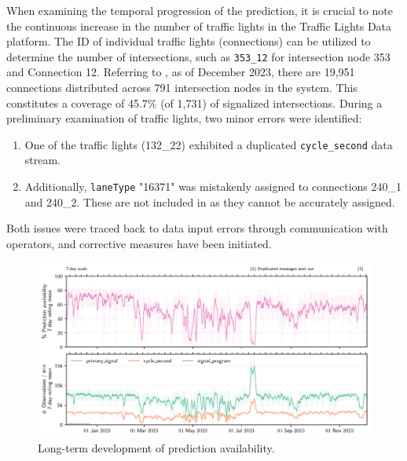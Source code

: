 When examining the temporal progression of the prediction, it is crucial to note the continuous increase in the number of traffic lights in the Traffic Lights Data platform. The ID of individual traffic lights (connections) can be utilized to determine the number of intersections, such as \texttt{353\_12} for intersection node 353 and Connection 12. Referring to , as of December 2023, there are 19,951 connections distributed across 791 intersection nodes in the system. This constitutes a coverage of 45.7\% (of 1,731) of signalized intersections. During a preliminary examination of traffic lights, two minor errors were identified:

\begin{enumerate}
    \item One of the traffic lights (132\_22) exhibited a duplicated \texttt{cycle\_second} data stream.
    \item Additionally, \texttt{laneType} "16371" was mistakenly assigned to connections 240\_1 and 240\_2. These are not included in  as they cannot be accurately assigned.
\end{enumerate}

Both issues were traced back to data input errors through communication with operators, and corrective measures have been initiated.

\begin{figure}[t]
    \centering
    \includegraphics[width=\linewidth]{images/monitoring-availability.pdf}
    \caption{Long-term development of prediction availability.}\label{fig:monitoring-availability}
\end{figure}

